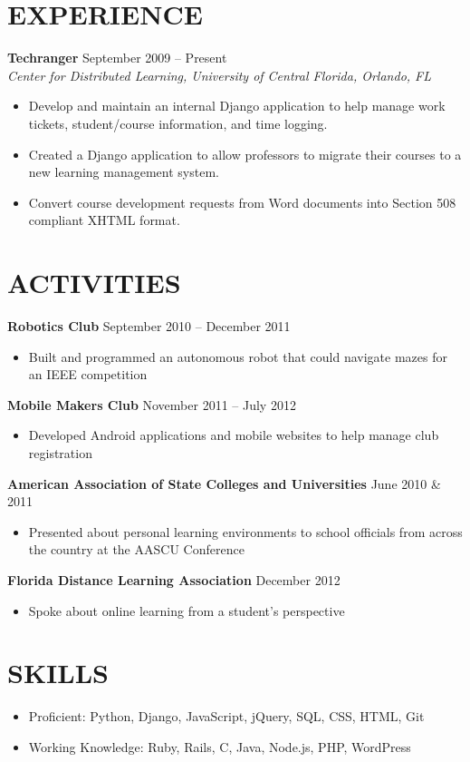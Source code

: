 \documentclass[margin]{res}
\begin{document}
\begin{resume}
\section{EXPERIENCE} 
\textbf{Techranger} \hfill September 2009 -- Present \\
\textit{Center for Distributed Learning, University of Central Florida, Orlando, FL} \smallskip
\begin{itemize}[leftmargin=10pt]
\item Develop and maintain an internal Django application to help manage work tickets, student/course information, and time logging.
\item Created a Django application to allow professors to migrate their courses to a new learning management system.
\item Convert course development requests from Word documents into Section 508 compliant XHTML format.
\end{itemize}

\section{ACTIVITIES}             
\textbf{Robotics Club} \hfill September 2010 -- December 2011
\begin{itemize}[leftmargin=10pt]
\itemsep -2pt %
\item Built and programmed an autonomous robot that could navigate mazes for an IEEE competition
\end{itemize}

\textbf{Mobile Makers Club} \hfill November 2011 -- July 2012 
\begin{itemize}[leftmargin=10pt]
\itemsep -2pt %
\item Developed Android applications and mobile websites to help manage club registration
\end{itemize}

\textbf{American Association of State Colleges and Universities} \hfill June 2010 \& 2011
\begin{itemize}[leftmargin=10pt]
\itemsep -2pt %
\item Presented about personal learning environments to school officials from across the country at the AASCU Conference
\end{itemize}

\textbf{Florida Distance Learning Association} \hfill December 2012
\begin{itemize}[leftmargin=10pt]
\itemsep -2pt %
\item Spoke about online learning from a student's perspective
\end{itemize}

\section{SKILLS}
\begin{itemize}[leftmargin=0pt]
\item[] Proficient: Python, Django, JavaScript, jQuery, SQL, CSS, HTML, Git
\item[] Working Knowledge: Ruby, Rails, C, Java, Node.js, PHP, WordPress
\end{itemize}

\end{resume}
\end{document}
